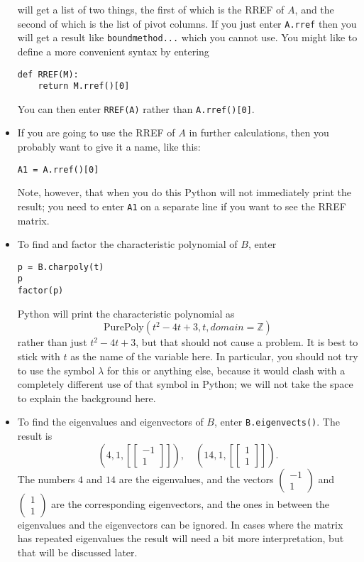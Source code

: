 \documentclass{amsart}
\begin{document}
\begin{itemize}
  will get a list of two things, the first of which is the RREF of
  $A$, and the second of which is the list of pivot columns.  If you
  just enter \verb|A.rref| then you will get a result like
  \verb|boundmethod...| which you cannot use.  You might like to
  define a more convenient syntax by entering
\begin{verbatim}
def RREF(M):
    return M.rref()[0]
\end{verbatim}
  You can then enter \verb|RREF(A)| rather than \verb|A.rref()[0]|.
 \item If you are going to use the RREF of $A$ in further
  calculations, then you probably want to give it a name, like this:
\begin{verbatim}
A1 = A.rref()[0]
\end{verbatim}
  Note, however, that when you do this Python will not immediately
  print the result; you need to enter \verb|A1| on a separate line if
  you want to see the RREF matrix.
 \item To find and factor the characteristic polynomial of $B$, enter 
\begin{verbatim}
p = B.charpoly(t)
p
factor(p)
\end{verbatim}
  Python will print the characteristic polynomial as 
  \[ \text{PurePoly}(t^2-4t+3,t,domain=\mathbb{Z}) \]
  rather than just $t^2-4t+3$, but that should not cause a problem.
  It is best to stick with $t$ as the name of the variable here.  In
  particular, you should not try to use the symbol $\lambda$ for this
  or anything else, because it would clash with a completely different
  use of that symbol in Python; we will not take the space to explain
  the background here. 
 \item To find the eigenvalues and eigenvectors of $B$, enter 
  \verb|B.eigenvects()|.  The result is 
  \[
  \left(4,1,\left[\left[\begin{array}{c}-1\\1\end{array}\right]\right]\right),\quad
  \left(14,1,\left[\left[\begin{array}{c}1\\1\end{array}\right]\right]\right).
  \]
  The numbers $4$ and $14$ are the eigenvalues, and the vectors
  $\begin{pmatrix}-1\\1\end{pmatrix}$ and 
  $\begin{pmatrix}1\\1\end{pmatrix}$ are the corresponding
  eigenvectors, and the ones in between the eigenvalues and the
  eigenvectors can be ignored.  In cases where the matrix has repeated
  eigenvalues the result will need a bit more interpretation, but that
  will be discussed later.
\end{itemize}
\end{document}
